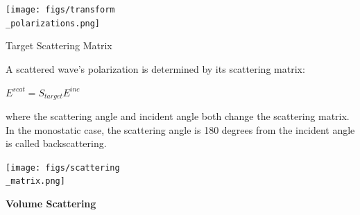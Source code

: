 \documentclass[10pt]{article}
\begin{document}
\begin{enumerate}
	\texttt{[image: figs/transform\\\_polarizations.png]}
	
	
	Target Scattering Matrix
	
	A scattered wave's polarization is determined by its scattering matrix:
	
	$E^{scat} = S_{target}E^{inc}$
	
	where the scattering angle and incident angle both change the scattering matrix. In the monostatic case, the scattering angle is 180
degrees from the incident angle is called backscattering.
	
	\texttt{[image: figs/scattering\\\_matrix.png]}


\end{enumerate}


{\bf Volume Scattering}
\end{document}

